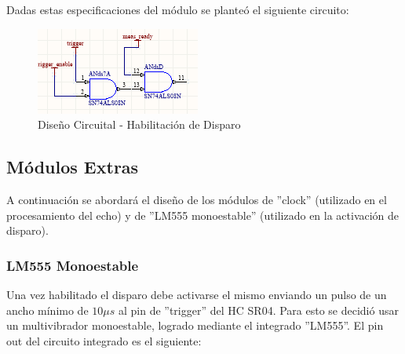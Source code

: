 Dadas estas especificaciones del módulo se planteó el siguiente circuito:

\begin{figure}[H]
\begin{centering}
\includegraphics[scale=0.8]{habilitacionDeDisparo.PNG}
\caption{Diseño Circuital - Habilitación de Disparo}
\par\end{centering}
\end{figure}

\subsection{Módulos Extras}

A continuación se abordará el diseño de los módulos de ''clock''
(utilizado en el procesamiento del echo) y de ''LM555 monoestable''
(utilizado en la activación de disparo).

\subsubsection{LM555 Monoestable}

Una vez habilitado el disparo debe activarse el mismo enviando un
pulso de un ancho mínimo de $10\mu s$ al pin de ''trigger'' del
HC SR04. Para esto se decidió usar un multivibrador monoestable, logrado
mediante el integrado ''LM555''. El pin out del circuito integrado
es el siguiente:

